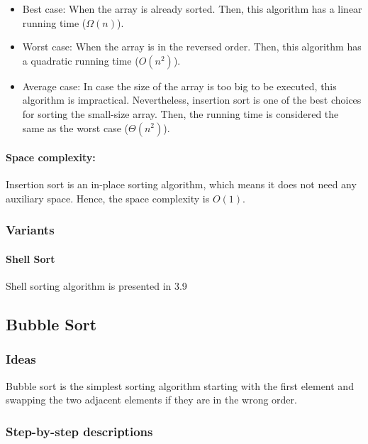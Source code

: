 \documentclass{article}
\newcommand\tab[1][0.5cm]{\hspace*{#1}}
\begin{document}
\begin{itemize}
    \item Best case: When the array is already sorted. Then, this algorithm has a linear running time ($\Omega(n)$).
    
    \item Worst case: When the array is in the reversed order. Then, this algorithm has a quadratic running time ($O(n^2)$).
    
    \item Average case: In case the size of the array is too big to be executed, this algorithm is impractical. Nevertheless, insertion sort is one of the best choices for sorting the small-size array. Then, the running time is considered the same as the worst case ($\Theta(n^2)$).
\end{itemize}

\paragraph{\tab Space complexity:}

Insertion sort is an in-place sorting algorithm, which means it does not need any auxiliary space. Hence, the space complexity is $O(1)$.

\subsubsection{Variants}

\paragraph{Shell Sort}

Shell sorting algorithm is presented in 3.9

\pagebreak

\subsection{Bubble Sort}

\subsubsection{Ideas}

\tab Bubble sort is the simplest sorting algorithm starting with the first element and swapping the two adjacent elements if they are in the wrong order.

\subsubsection{Step-by-step descriptions}
\end{document}
